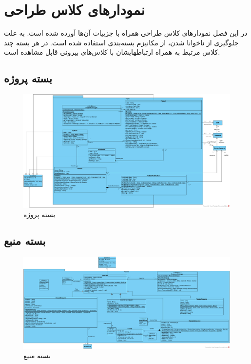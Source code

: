 \chapter{نمودارهای کلاس طراحی}
در این فصل نمودارهای کلاس طراحی همراه با جزییات آن‌ها آورده شده است. به علت جلوگیری از ناخوانا شدن، از مکانیزم بسته‌بندی
استفاده شده است. در هر بسته چند کلاس مرتبط به همراه ارتباطهایشان با کلاس‌های بیرونی قابل مشاهده است.
\begin{landscape}
\section{بسته پروژه}
\begin{figure}[H]
	\centering
	\includegraphics[scale=0.4]{img/class-design/ProjectPackage}
	\caption{بسته پروژه}
\end{figure}


\section{بسته منبع}
\begin{figure}[H]
	\centering
	\includegraphics[scale=0.45]{img/class-design/ResourcePackage}
	\caption{بسته منیع}
\end{figure}



\end{landscape}
